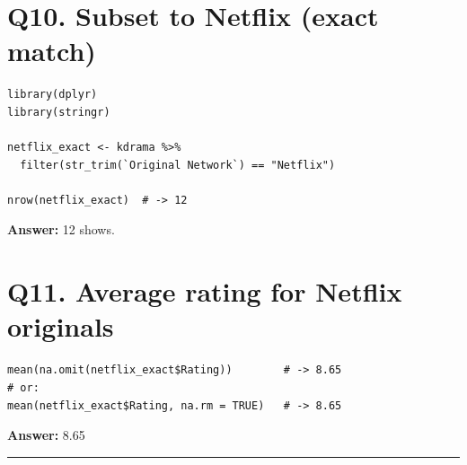 \documentclass[11pt]{article}
\begin{document}
\section*{Q10. Subset to Netflix (exact match)}
\begin{lstlisting}
library(dplyr)
library(stringr)

netflix_exact <- kdrama %>%
  filter(str_trim(`Original Network`) == "Netflix")

nrow(netflix_exact)  # -> 12
\end{lstlisting}
\textbf{Answer:} 12 shows.

\section*{Q11. Average rating for Netflix originals}
\begin{lstlisting}
mean(na.omit(netflix_exact$Rating))        # -> 8.65
# or:
mean(netflix_exact$Rating, na.rm = TRUE)   # -> 8.65
\end{lstlisting}
\textbf{Answer:} 8.65

\bigskip
\hrule
\bigskip
\end{document}
